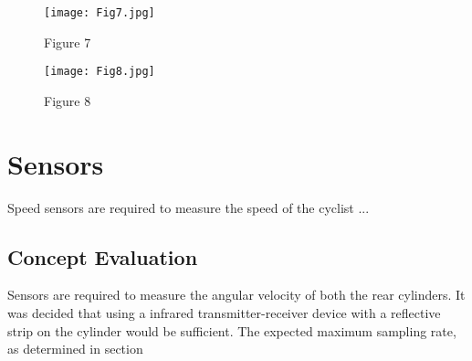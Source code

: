\begin{figure}[H]
	\begin{center}
		\texttt{[image: Fig7.jpg]}
		\caption{Figure 7}
		\label{fig:7}
	\end{center}
\end{figure}
\begin{figure}[H]
	\begin{center}
		\texttt{[image: Fig8.jpg]}
		\caption{Figure 8}
		\label{fig:8}
	\end{center}
\end{figure}

\newpage
\section{Sensors}
Speed sensors are required to measure the speed of the cyclist ...
\subsection{Concept Evaluation}
Sensors are required to measure the angular velocity of both the rear cylinders. It was decided that using a infrared transmitter-receiver device with a reflective strip on the cylinder would be sufficient. The expected maximum sampling rate, as determined in section 